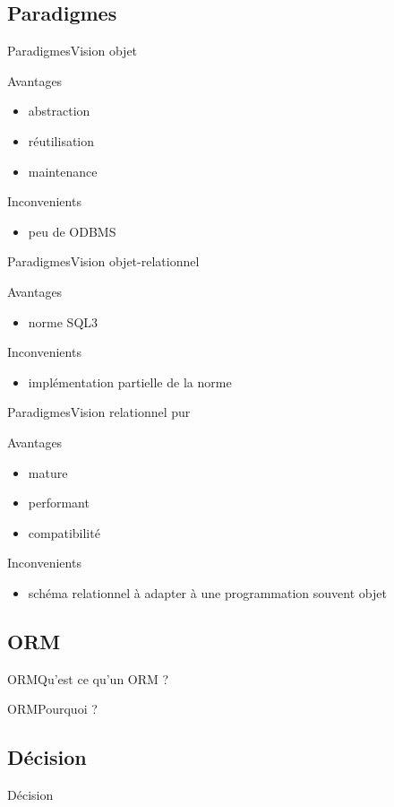 \subsection{Paradigmes}
\begin{frame}{Paradigmes}{Vision objet}
  \begin{block}{Avantages}
    \begin{itemize}
      \item abstraction
      \item réutilisation
      \item maintenance
    \end{itemize}
  \end{block}
  \begin{block}{Inconvenients}
    \begin{itemize}
      \item peu de ODBMS
    \end{itemize}
  \end{block}
\end{frame}

\begin{frame}{Paradigmes}{Vision objet-relationnel}
  \begin{block}{Avantages}
    \begin{itemize}
      \item norme SQL3
    \end{itemize}
  \end{block}
  \begin{block}{Inconvenients}
    \begin{itemize}
      \item implémentation partielle de la norme
    \end{itemize}
  \end{block}
\end{frame}

\begin{frame}{Paradigmes}{Vision relationnel pur}
  \begin{block}{Avantages}
    \begin{itemize}
      \item mature
      \item performant
      \item compatibilité
    \end{itemize}
  \end{block}
  \begin{block}{Inconvenients}
    \begin{itemize}
      \item schéma relationnel à adapter à une programmation souvent objet
    \end{itemize}
  \end{block}
\end{frame}

\subsection{ORM}
\begin{frame}{ORM}{Qu'est ce qu'un ORM ?}
\end{frame}

\begin{frame}{ORM}{Pourquoi ?}
\end{frame}

\subsection{Décision}
\begin{frame}{Décision}
\end{frame}
